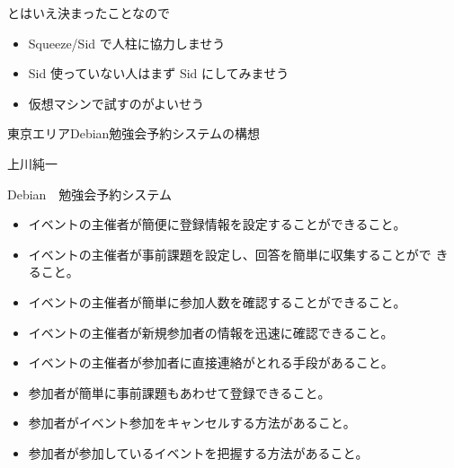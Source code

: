 
\begin{frame}{とはいえ決まったことなので}
 \begin{itemize}
  \item Squeeze/Sid で人柱に協力しませう
  \item Sid 使っていない人はまず Sid にしてみませう
  \item 仮想マシンで試すのがよいせう
 \end{itemize}
\end{frame}


\begin{frame}{}
 
 東京エリアDebian勉強会予約システムの構想

 上川純一
 
\end{frame}


\begin{frame}{Debian　勉強会予約システム}
 \begin{itemize}
 \item イベントの主催者が簡便に登録情報を設定することができること。
 \item イベントの主催者が事前課題を設定し、回答を簡単に収集することがで
       きること。
 \item イベントの主催者が簡単に参加人数を確認することができること。
 \item イベントの主催者が新規参加者の情報を迅速に確認できること。
 \item イベントの主催者が参加者に直接連絡がとれる手段があること。
 \item 参加者が簡単に事前課題もあわせて登録できること。
 \item 参加者がイベント参加をキャンセルする方法があること。
 \item 参加者が参加しているイベントを把握する方法があること。
\end{itemize}
\end{frame}

